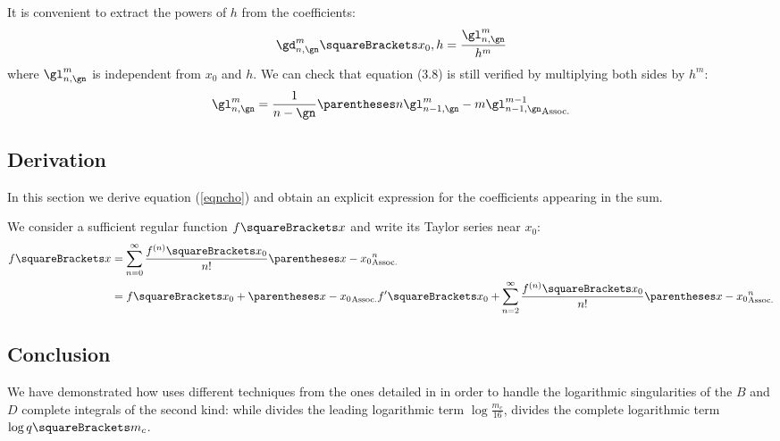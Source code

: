 \documentclass[10pt, a4paper, twoside]{basestyle}
\begin{document}
It is convenient to extract the powers of $h$ from the coefficients:
\[
\gd^{m}_{n,\gn}\of{x_0, h} = \frac{\gl^{m}_{n,\gn}}{h^m}
\]
where $\gl^{m}_{n,\gn}$ is independent from $x_0$ and $h$.  We can check that equation (3.8) is still verified by multiplying both sides by $h^m$:
\[
\gl^{m}_{n,\gn} = \frac{1}{n - \gn} \pa{n \gl^{m}_{n - 1,\gn} - m \gl^{m - 1}_{n - 1,\gn}}
\]

\subsection*{Derivation}
In this section we derive equation (\ref{eqncho}) and obtain an explicit expression for the coefficients appearing in the sum.

We consider a sufficient regular function $f\of{x}$ and write its Taylor series near $x_0$:
\begin{align*}
f\of{x} &= \sum{n = 0}[\infty]{\frac{f^{(n)}\of{x_0}}{\Factorial{n}} \pa{x - x_0}^n}\\
&=f\of{x_0} + \pa{x - x_0} f\der\of{x_0} + \sum{n = 2}[\infty]{\frac{f^{(n)}\of{x_0}}{\Factorial{n}} \pa{x - x_0}^n}
\end{align*}


\subsection*{Conclusion}
We have demonstrated how \cite{Fukushima2018} uses different techniques from the ones detailed in \cite{Fukushima2011a} in order to handle the 
logarithmic singularities of the $B$ and $D$ complete integrals of the second kind: while \cite{Fukushima2011a} divides the leading logarithmic term $\log \frac{m_c}{16}$, \cite{Fukushima2018} divides the complete logarithmic term $\log q\of{m_c}$.
\printbibliography
\end{document}
